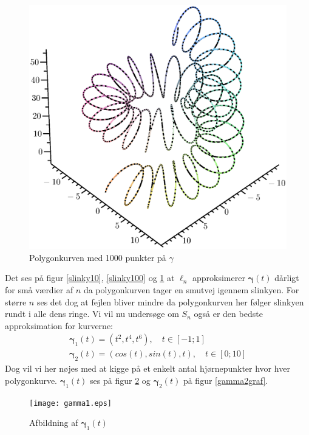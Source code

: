 \begin{figure}[hb]
\center
\includegraphics[scale=0.4]{pictures/slinky1000.eps}
\caption{Polygonkurven med 1000 punkter på \(\gamma\)}
\label{slinky1000}
\end{figure}
Det ses på figur \ref{slinky10}, \ref{slinky100} og \ref{slinky1000} at \(\ell_n\) approksimerer \(\pmb{\gamma}(t)\) dårligt for små værdier af \(n\) da polygonkurven tager en smutvej igennem slinkyen. For større \(n\) ses det dog at fejlen bliver mindre da polygonkurven her følger slinkyen rundt i alle dens ringe.
\clearpage
Vi vil nu undersøge om \(S_n\) også er den bedste approksimation for kurverne:
\begin{equation}
\begin{gathered}
\pmb{\gamma}_1(t)=(t^2,t^4,t^6), \quad t\in[-1;1] \\
\pmb{\gamma}_2(t)=(cos(t),sin(t),t), \quad t\in [0;10]
\end{gathered}
\end{equation}
Dog vil vi her nøjes med at kigge på et enkelt antal hjørnepunkter hvor hver polygonkurve. \(\pmb{\gamma}_1(t)\) ses på figur \ref{gamma1graf} og \(\pmb{\gamma}_2(t)\) på figur \ref{gamma2graf}. \\
\begin{figure}[ht]
\center
\texttt{[image: gamma1.eps]}
\caption{Afbildning af \(\pmb{\gamma}_1(t)\)}
\label{gamma1graf}
\end{figure}
